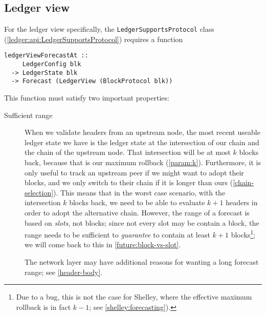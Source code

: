 \subsection{Ledger view}
\label{forecast:ledgerview}

For the ledger view specifically, the \lstinline!LedgerSupportsProtocol!
class (\cref{ledger:api:LedgerSupportsProtocol}) requires a function
%
\begin{lstlisting}
ledgerViewForecastAt ::
     LedgerConfig blk
  -> LedgerState blk
  -> Forecast (LedgerView (BlockProtocol blk))
\end{lstlisting}
%
This function must satisfy two important properties:
%
\begin{description}
\item[Sufficient range]

When we validate headers from an upstream node, the most recent useable ledger
state we have is the ledger state at the intersection of our chain and the chain
of the upstream node. That intersection will be at most $k$ blocks back, because
that is our maximum rollback (\cref{param:k}). Furthermore, it is only useful to
track an upstream peer if we might want to adopt their blocks, and we only
switch to their chain if it is longer than ours (\cref{chain-selection}). This
means that in the worst case scenario, with the intersection $k$ blocks back, we
need to be able to evaluate $k + 1$ headers in order to adopt the alternative
chain. However, the range of a forecast is based on \emph{slots}, not blocks;
since not every slot may be contain a block, the range needs to be sufficient to \emph{guarantee} to contain at
least $k + 1$ blocks\footnote{Due to a bug, this is not the case for Shelley,
where the effective maximum rollback is in fact $k - 1$; see
\cref{shelley:forecasting}).}; we will come back to this in
\cref{future:block-vs-slot}.

The network layer may have additional reasons for wanting a long forecast
range; see \cref{header-body}.


\end{description}

